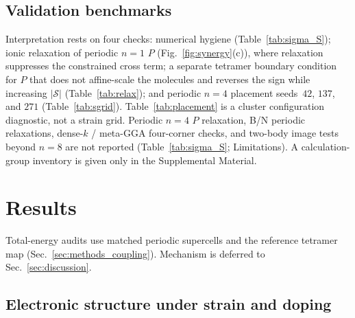 \documentclass[%
 reprint,
 groupedaddress,
 amsmath,amssymb,
 aps,
 prb,
 floatfix,
]{revtex4-2}
\begin{document}


\subsection{Validation benchmarks}
\label{sec:validation}
Interpretation rests on four checks: numerical hygiene (Table~\ref{tab:sigma_S}); ionic relaxation of periodic $n{=}1$ $P$ (Fig.~\ref{fig:synergy}(c)), where relaxation suppresses the constrained cross term; a separate tetramer boundary condition for $P$ that does not affine-scale the molecules and reverses the sign while increasing $|\mathcal{S}|$ (Table~\ref{tab:relax}); and periodic $n{=}4$ placement seeds~$42$, $137$, and $271$ (Table~\ref{tab:sgrid}). Table~\ref{tab:placement} is a cluster configuration diagnostic, not a strain grid.
Periodic $n{=}4$ $P$ relaxation, B/N periodic relaxations, dense-$k$ / meta-GGA four-corner checks, and two-body image tests beyond $n{=}8$ are not reported (Table~\ref{tab:sigma_S}; Limitations).
A calculation-group inventory is given only in the Supplemental Material.





\FloatBarrier

\section{\label{sec:results}Results}

Total-energy audits use matched periodic supercells and the reference tetramer map (Sec.~\ref{sec:methods_coupling}). Mechanism is deferred to Sec.~\ref{sec:discussion}.

\subsection{\label{sec:electronic}Electronic structure under strain and doping}
\end{document}
